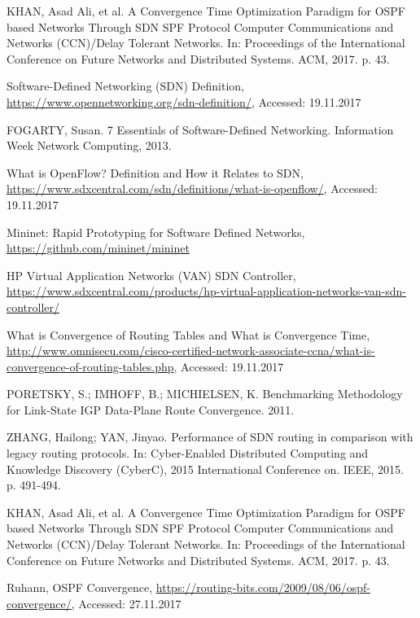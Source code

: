 \documentclass[conference]{IEEEtran}
\begin{document}
\begin{thebibliography}{1}
KHAN, Asad Ali, et al. A Convergence Time Optimization Paradigm for OSPF based Networks Through SDN SPF Protocol Computer Communications and Networks (CCN)/Delay Tolerant Networks. In: Proceedings of the International Conference on Future Networks and Distributed Systems. ACM, 2017. p. 43.

Software-Defined Networking (SDN) Definition, \url{https://www.opennetworking.org/sdn-definition/}, Accessed: 19.11.2017

FOGARTY, Susan. 7 Essentials of Software-Defined Networking. Information Week Network Computing, 2013.

What is OpenFlow? Definition and How it Relates to SDN, \url{https://www.sdxcentral.com/sdn/definitions/what-is-openflow/},  Accessed: 19.11.2017

Mininet: Rapid Prototyping for Software Defined Networks, \url{https://github.com/mininet/mininet}

HP Virtual Application Networks (VAN) SDN Controller, \url{https://www.sdxcentral.com/products/hp-virtual-application-networks-van-sdn-controller/}

What is Convergence of Routing Tables and What is Convergence Time, \url{http://www.omnisecu.com/cisco-certified-network-associate-ccna/what-is-convergence-of-routing-tables.php},  Accessed: 19.11.2017

PORETSKY, S.; IMHOFF, B.; MICHIELSEN, K. Benchmarking Methodology for Link-State IGP Data-Plane Route Convergence. 2011.

ZHANG, Hailong; YAN, Jinyao. Performance of SDN routing in comparison with legacy routing protocols. In: Cyber-Enabled Distributed Computing and Knowledge Discovery (CyberC), 2015 International Conference on. IEEE, 2015. p. 491-494.

KHAN, Asad Ali, et al. A Convergence Time Optimization Paradigm for OSPF based Networks Through SDN SPF Protocol Computer Communications and Networks (CCN)/Delay Tolerant Networks. In: Proceedings of the International Conference on Future Networks and Distributed Systems. ACM, 2017. p. 43.

Ruhann, OSPF Convergence, \url{https://routing-bits.com/2009/08/06/ospf-convergence/}, Accessed: 27.11.2017

\end{thebibliography}
\end{document}

